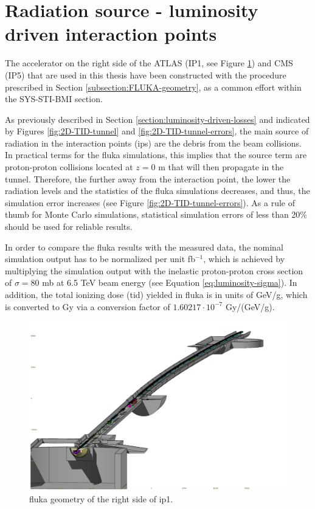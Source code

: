 \documentclass[encoding=utf8,british]{tumphthesis}
\begin{document}
\section{Radiation source - luminosity driven interaction points}

The accelerator on the right side of the ATLAS (IP1, see Figure \ref{fig:FLUKA-Geometry-IP1-Right}) and CMS (IP5) that are used in this thesis have been constructed with the procedure prescribed in Section \ref{subsection:FLUKA-geometry}, as a common effort within the SYS-STI-BMI section.


As previously described in Section \ref{section:luminosity-driven-losses} and indicated by Figures \ref{fig:2D-TID-tunnel} and \ref{fig:2D-TID-tunnel-errors}, the main source of radiation in the interaction points (\acrshort{ip}s) are the debris from the beam collisions. In practical terms for the \acrshort{fluka} simulations, this implies that the source term are proton-proton collisions located at $z=0$ m that will then propagate in the tunnel. Therefore, the further away from the interaction point, the lower the radiation levels and the statistics of the \acrshort{fluka} simulations decreases, and thus, the simulation error increases (see Figure \ref{fig:2D-TID-tunnel-errors}). As a rule of thumb for Monte Carlo simulations, statistical simulation errors of less than 20\% should be used for reliable results. 

In order to compare the \acrshort{fluka} results with the measured data, the nominal simulation output has to be normalized per unit fb$^{-1}$, which is achieved by multiplying the simulation output with the inelastic proton-proton cross section of $\sigma=80$ mb at 6.5 TeV beam energy (see Equation \ref{eq:luminosity-sigma}). In addition, the total ionizing dose (\acrshort{tid}) yielded in \acrshort{fluka} is in units of GeV/g, which is converted to Gy via a conversion factor of $1.60217 \cdot 10^{-7}$ Gy/(GeV/g).
\begin{figure}[H]
    \centering
    \includegraphics[width=0.8\linewidth]{figures/FLUKA_geometry_IP1_right.png}
    \caption{\acrshort{fluka} geometry of the right side of \acrshort{ip}1.}
    \label{fig:FLUKA-Geometry-IP1-Right}
\end{figure}
\end{document}
